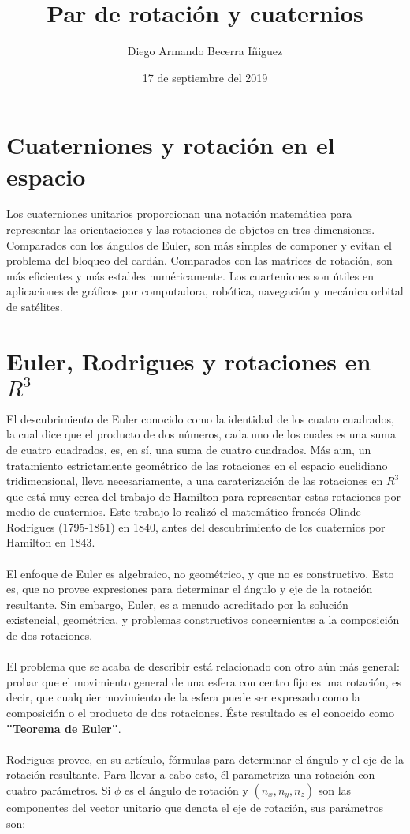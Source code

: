 \documentclass[12pt,a4paper]{report}
\author{Diego Armando Becerra Iñiguez}
\title{Par de rotación y cuaternios}
\date{17 de septiembre del 2019}
\begin{document}
\maketitle
\section{Cuaterniones y rotación en el espacio}
Los cuaterniones unitarios proporcionan una notación matemática para representar las orientaciones y las rotaciones de objetos en tres dimensiones. Comparados con los ángulos de Euler, son más simples de componer y evitan el problema del bloqueo del cardán. Comparados con las matrices de rotación, son más eficientes y más estables numéricamente. Los cuarteniones son útiles en aplicaciones de gráficos por computadora, robótica, navegación y mecánica orbital de satélites.
\section{Euler, Rodrigues y rotaciones en $R^{3}$}
El descubrimiento de Euler conocido como la identidad de los cuatro cuadrados, la cual dice que el producto de dos números, cada uno de los cuales es una suma de cuatro cuadrados, es, en sí, una suma de cuatro cuadrados.
Más aun, un tratamiento estrictamente geométrico de las rotaciones en el espacio euclidiano tridimensional, lleva necesariamente, a una caraterización de las
rotaciones en $R^{3}$ que está muy cerca del trabajo de Hamilton para representar estas rotaciones por medio de cuaternios. Este trabajo lo realizó el matemático francés Olinde Rodrigues (1795-1851) en 1840, antes del descubrimiento de los cuaternios por Hamilton en 1843.
\\\\El enfoque de Euler es algebraico, no geométrico, y que no es constructivo. Esto es, que no provee expresiones para determinar el ángulo y eje de la rotación resultante. Sin embargo, Euler, es a menudo acreditado por la solución existencial, geométrica, y problemas constructivos concernientes a la composición de dos rotaciones.
\\\\El problema que se acaba de describir está relacionado con otro aún más general:
probar que el movimiento general de una esfera con centro fijo es una rotación, es decir, que cualquier movimiento de la esfera puede ser expresado como la composición o el producto de dos rotaciones. Éste resultado es el conocido como \textbf{¨Teorema de Euler¨}.
\\\\Rodrigues provee, en su artículo, fórmulas para determinar el ángulo y el eje de la rotación resultante. Para llevar a cabo esto, él parametriza una rotación con cuatro parámetros. Si $\phi$ es el ángulo de rotación y $(n_{x},n_{y},n_{z})$ son las componentes del vector unitario que denota el eje de rotación, sus parámetros son:
\end{document}
